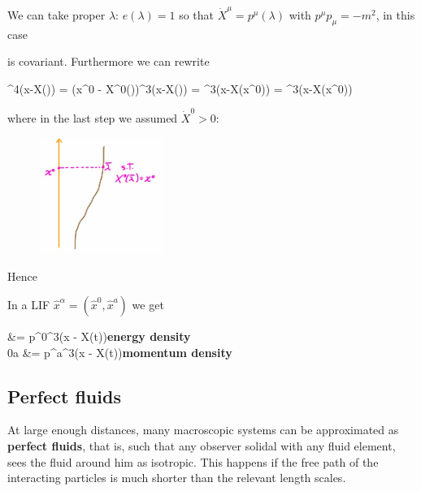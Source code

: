 \documentclass[../main/main.tex]{subfiles}
\begin{document}
We can take proper $\lambda$: $e(\lambda) = 1$ so that $\dot X^\mu = p^\mu(\lambda)$ with $p^\mu p_\mu = -m^2$, in this case 
\begin{eqalign}\end{eqalign}
is covariant.  Furthermore we can rewrite
\begin{eqalign}
	\delta^4(x-X(\lambda)) = \delta(x^0 - X^0(\lambda))\delta^3(\vec x-\vec X(\lambda)) = \delta^3(\vec x-\vec X(x^0)) = \delta^3(\vec x-\vec X(x^0))
\end{eqalign}
where in the last step we assumed $\dot X^0>0$: 
\begin{figure}[H]
\centering
\includegraphics[width=4cm]{../img/delta_rewr_iemt_interp.jpg}
\end{figure}
\noindent
Hence
\begin{eqalign}\end{eqalign}
In a LIF $\hat x^\alpha = (\hat x^0, \hat x^a)$ we get
\begin{eqalign}
	 &= \hat p^0\delta^3(\vec x - \vec X(t))\quad\textbf{energy density}\\
	\hiemt0a &= \hat p^a\delta^3(\vec x - \vec X(t))\quad\textbf{momentum density}
\end{eqalign}

\subsection{Perfect fluids}

At large enough distances, many macroscopic systems can be approximated as \textbf{perfect fluids}, that is, such that any observer solidal with any fluid element, sees the fluid around him as isotropic. This happens if the free path of the interacting particles is much shorter than the relevant length scales. 
\end{document}
